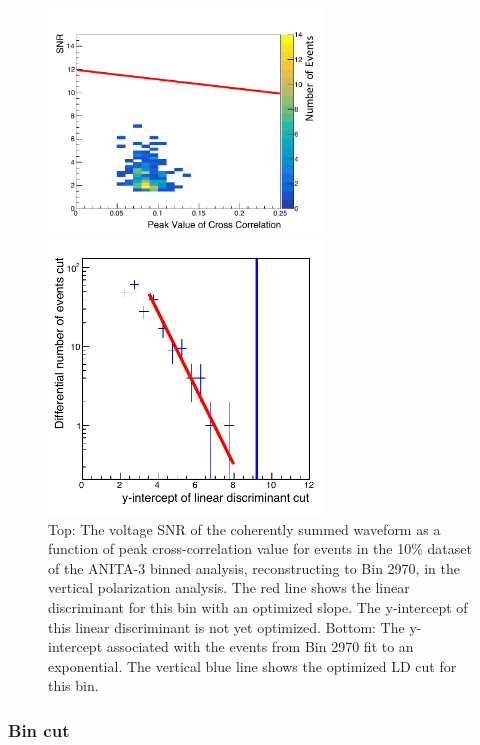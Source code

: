 \begin{figure}[p]
\centering
\includegraphics[width=0.65\textwidth]{figures/oindreeCorrSnrHist02970_175_439_V.pdf}
\par
\includegraphics[width=0.65\textwidth]{figures/diffPlotVBin2970.pdf}
\caption{Top: The voltage SNR of the coherently summed waveform as a function of peak cross-correlation value for events in the 10\% dataset of the ANITA-3 binned analysis, reconstructing to Bin 2970, in the vertical polarization analysis. The red line shows the linear discriminant for this bin with an optimized slope. The y-intercept of this linear discriminant is not yet optimized. Bottom: The y-intercept associated with the events from Bin 2970 fit to an exponential. The vertical blue line shows the optimized LD cut for this bin.}
\label{bin2970}
\end{figure}


\subsubsection{Bin cut}

